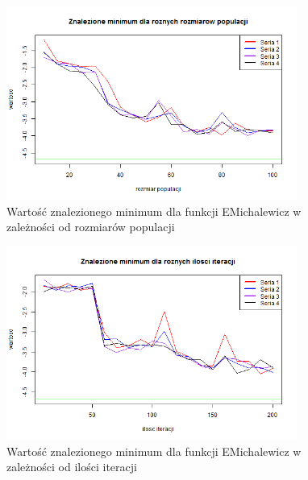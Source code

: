 \documentclass[11pt, a4paper]{article}
\begin{document}
\begin{figure}[H]
	\begin{center}
		\includegraphics[width=0.85\textwidth]{./assets/EMichalewicz4.png}
		\caption{Wartość znalezionego minimum dla funkcji EMichalewicz w zależności od rozmiarów populacji}
		\label{fig:emichalewicz4}
	\end{center}
\end{figure}

\begin{figure}[H]
	\begin{center}
		\includegraphics[width=0.85\textwidth]{./assets/EMichalewicz5.png}
		\caption{Wartość znalezionego minimum dla funkcji EMichalewicz w zależności od ilości iteracji}
		\label{fig:emichalewicz5}
	\end{center}
\end{figure}
\end{document}
